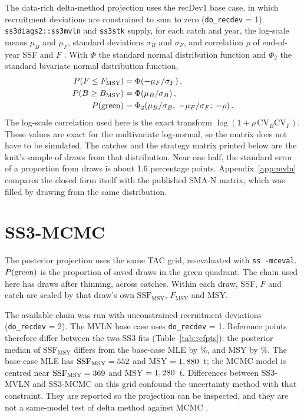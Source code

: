 \documentclass[11pt,a4paper]{article}
\begin{document}
The data-rich delta-method projection uses the recDev1 base case, in which
recruitment deviations are constrained to sum to zero (\texttt{do\_recdev}
= 1). \texttt{ss3diags2::ss3mvln} and \texttt{ss3stk} supply, for each catch
and year, the log-scale means $\mu_B$ and $\mu_F$, standard deviations
$\sigma_B$ and $\sigma_F$, and correlation $\rho$ of end-of-year SSF and $F$
\citep{ss3diags2,Kell2023MVLN}. With $\Phi$ the standard normal distribution
function and $\Phi_2$ the standard bivariate normal distribution function,
\begin{align}
  P(F \le F_{\mathrm{MSY}}) &= \Phi\!\left(-\mu_F/\sigma_F\right), \\
  P(B \ge B_{\mathrm{MSY}}) &= \Phi\!\left(\mu_B/\sigma_B\right), \\
  P(\mathrm{green}) &= \Phi_2\!\left(\mu_B/\sigma_B,\; -\mu_F/\sigma_F;\; -\rho\right).
\end{align}
The log-scale correlation used here is the exact transform
$\log(1 + \rho\,\mathrm{CV}_B\mathrm{CV}_F)$. These values are exact for the
multivariate log-normal, so the matrix does not have to be simulated.
The catches and the strategy matrix printed below are the knit's sample of
\nDraw{} draws from that distribution. Near one half, the standard error of
a proportion from \nDraw{} draws is about 1.6 percentage points.
Appendix~\ref{app:mvln} compares the closed form itself with the published
SMA-N matrix, which was filled by drawing from the same distribution.

\section{SS3-MCMC}

The posterior projection uses the same TAC grid, re-evaluated with
\texttt{ss -mceval}. $P(\mathrm{green})$ is the proportion of saved draws in the green
quadrant. The chain used here has \nMcmc{} draws after thinning, across
\mcmcCatches{} catches. Within each draw, SSF, $F$ and catch are scaled by
that draw's own $\mathrm{SSF_{MSY}}$, $F_{\mathrm{MSY}}$ and MSY.

The available chain was run with unconstrained recruitment deviations
(\texttt{do\_recdev} = 2). The MVLN base case uses \texttt{do\_recdev} = 1.
Reference points therefore differ between the two SS3 fits
(Table~\ref{tab:refpts}): the posterior median of $\mathrm{SSF_{MSY}}$
differs from the base-case MLE by \rpSsbmsyDiff\%, and MSY by \rpMsyDiff\%.
The base-case MLE has $\mathrm{SSF_{MSY}} = 552$ and
MSY $= 1,880$~t; the MCMC model is centred near
$\mathrm{SSF_{MSY}} = 369$ and MSY $= 1,280$~t. Differences
between SS3-MVLN and SS3-MCMC on this grid confound the uncertainty method
with that constraint. They are reported so the projection can be inspected,
and they are not a same-model test of delta method against MCMC
\citep{SharkWG2026}.
\end{document}
